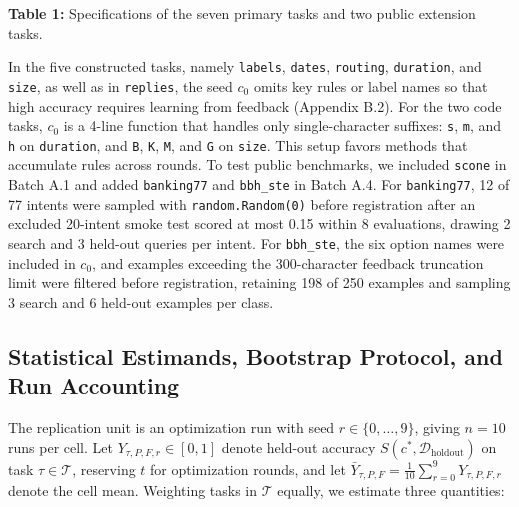 \documentclass[10pt]{article}
\begin{document}
\textbf{Table 1:} Specifications of the seven primary tasks and two
public extension tasks.

In the five constructed tasks, namely \texttt{labels}, \texttt{dates},
\texttt{routing}, \texttt{duration}, and \texttt{size}, as well as in
\texttt{replies}, the seed \(c_0\) omits key rules or label names so
that high accuracy requires learning from feedback (Appendix B.2). For
the two code tasks, \(c_0\) is a 4-line function that handles only
single-character suffixes: \texttt{s}, \texttt{m}, and \texttt{h} on
\texttt{duration}, and \texttt{B}, \texttt{K}, \texttt{M}, and
\texttt{G} on \texttt{size}. This setup favors methods that accumulate
rules across rounds. To test public benchmarks, we included
\texttt{scone} \citep{she2023scone} in Batch A.1 and added
\texttt{banking77} \citep{casanueva2020efficient} and \texttt{bbh\_ste}
\citep{suzgun2022challenging} in Batch A.4. For \texttt{banking77}, 12
of 77 intents were sampled with \texttt{random.Random(0)} before
registration after an excluded 20-intent smoke test scored at most 0.15
within 8 evaluations, drawing 2 search and 3 held-out queries per
intent. For \texttt{bbh\_ste}, the six option names were included in
\(c_0\), and examples exceeding the 300-character feedback truncation
limit were filtered before registration, retaining 198 of 250 examples
and sampling 3 search and 6 held-out examples per class.

\hypertarget{statistical-estimands-bootstrap-protocol-and-run-accounting}{%
\subsection{Statistical Estimands, Bootstrap Protocol, and Run
Accounting}\label{statistical-estimands-bootstrap-protocol-and-run-accounting}}

The replication unit is an optimization run with seed
\(r \in \{0, \dots, 9\}\), giving \(n = 10\) runs per cell. Let
\(Y_{\tau,P,F,r} \in [0, 1]\) denote held-out accuracy
\(S(c^*, \mathcal{D}_{\text{holdout}})\) on task
\(\tau \in \mathcal{T}\), reserving \(t\) for optimization rounds, and
let \(\bar{Y}_{\tau,P,F} = \frac{1}{10}\sum_{r=0}^9 Y_{\tau,P,F,r}\)
denote the cell mean. Weighting tasks in \(\mathcal{T}\) equally, we
estimate three quantities:
\end{document}
